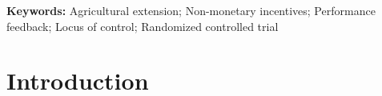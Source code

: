\documentclass[11pt]{article}
\begin{document}
\begin{abstract}
\end{abstract}

\noindent\textbf{Keywords:} Agricultural extension; Non-monetary incentives; Performance feedback; Locus of control; Randomized controlled trial

\clearpage

\section{Introduction}
\end{document}
